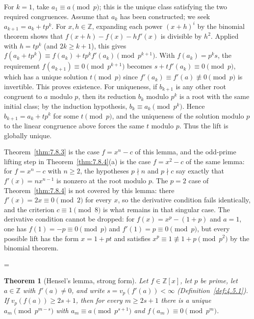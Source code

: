 \documentclass[11pt]{article}
\makeatletter
\theoremstyle{ntstyle}
\newtheorem{theorem}{Theorem}[subsection]
\let\nt@closedisplay\]
\def\nt@guardedclose{\@ifnextchar\par{\nt@closeafterpar}{\@ifnextchar\end{\postdisplaypenalty\@M\nt@closedisplay}{\nt@closedisplay}}}
\def\nt@closeafterpar\par{\@ifnextchar\par{\nt@closeafterpar}{\@ifnextchar\end{\postdisplaypenalty\@M\nt@closedisplay\par}{\nt@closedisplay\par}}}
\renewenvironment{proof}[1][\proofname]{\par
  \pushQED{\qed}\normalfont\topsep\medskipamount\edef\nt@afterproof{\@endparpenalty=\the\@endparpenalty\relax}\@beginparpenalty\@M\@endparpenalty\@M\let\]\nt@guardedclose\trivlist\item[]\textit{#1\@addpunct{.}} \ignorespaces}{\ifvmode\addpenalty\@M\fi\popQED\nt@afterproof\endtrivlist\@endpefalse}
\makeatother
\begin{document}
\begin{proof} For $k=1$, take $a_1\equiv a\pmod p$; this is the unique
	class satisfying the two required congruences. Assume that $a_k$ has
	been constructed; we seek $a_{k+1}=a_k+tp^k$.
	For $x,h\in\mathbb{Z}$, expanding each power $(x+h)^i$ by the
	binomial theorem shows that
	$f(x+h)-f(x)-hf'(x)$ is divisible by $h^2$. Applied with
	$h=tp^k$ (and $2k\ge k+1$), this gives
	$f(a_k + tp^k)\equiv f(a_k) +
		t p^k f'(a_k)\pmod{p^{k+1}}$. With $f(a_k) = p^k s$, the
	requirement $f(a_{k+1})\equiv0\pmod{p^{k+1}}$ becomes $s + t
		f'(a_k)\equiv0\pmod{p}$, which has a unique solution $t\pmod{p}$ since
	$f'(a_k)\equiv f'(a)\not\equiv0\pmod{p}$ is invertible. This proves existence. For uniqueness, if $b_{k+1}$ is any other root congruent to $a$ modulo $p$, then its reduction $b_k$ modulo $p^k$ is a root with the same initial class; by the induction hypothesis, $b_k\equiv a_k\pmod{p^k}$. Hence $b_{k+1}=a_k+tp^k$ for some $t\pmod{p}$, and the uniqueness of the solution modulo $p$ to the linear congruence above forces the same $t$ modulo $p$. Thus the lift is globally unique.

	Theorem~\ref{thm:7.8.3} is the case $f=x^n-c$ of this lemma, and the
	odd-prime lifting step in Theorem~\ref{thm:7.8.4}(a) is the case $f=x^2-c$ of the same lemma:
	for $f=x^n-c$ with $n\ge2$, the hypotheses $p\nmid n$ and
	$p\nmid c$ say exactly that $f'(x) = n x^{n-1}$ is nonzero at the root
	modulo $p$. The $p = 2$ case of Theorem~\ref{thm:7.8.4} is not covered by this
	lemma: there $f'(x) = 2x \equiv 0 \pmod{2}$ for every $x$, so the derivative
	condition fails identically, and the criterion $c\equiv1\pmod8$ is what
	remains in that singular case. The derivative condition cannot be
	dropped: for $f(x)=x^p-(1+p)$ and $a=1$, one has
	$f(1)=-p\equiv0\pmod p$ and $f'(1)=p\equiv0\pmod p$, but every possible
	lift has the form $x=1+pt$ and satisfies $x^p\equiv1\not\equiv1+p\pmod{p^2}$ by
	the binomial theorem.

\end{proof}

\begin{theorem}[Hensel's lemma, strong form]\label{thm:11.4.2} Let $f\in\mathbb{Z}[x]$, let $p$
	be prime, let $a\in\mathbb{Z}$ with $f'(a)\neq0$, and write
	$s = v_p(f'(a))<\infty$ (Definition~\ref{def:4.5.1}). If $v_p(f(a))\ge2s + 1$, then for every $m\ge2s + 1$
	there is a unique $a_m\pmod{p^{m-s}}$ with $a_m\equiv a\pmod{p^{s+1}}$
	and $f(a_m)\equiv0\pmod{p^{m}}$.

\end{theorem}
\end{document}
